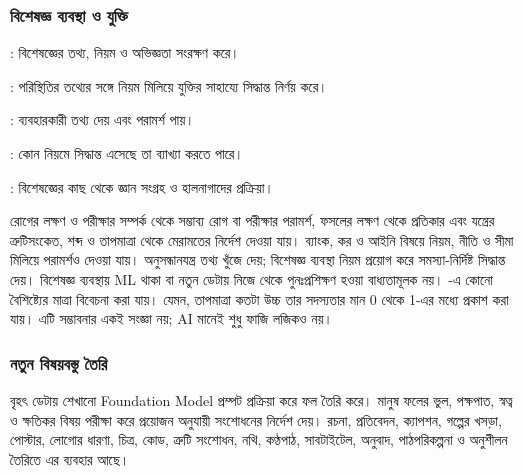 \begin{topicbody}
\subsubsection{বিশেষজ্ঞ ব্যবস্থা ও যুক্তি}
\begin{compactpoints}
\item {}: বিশেষজ্ঞের তথ্য, নিয়ম ও অভিজ্ঞতা সংরক্ষণ করে।
\item {}: পরিস্থিতির তথ্যের সঙ্গে নিয়ম মিলিয়ে যুক্তির সাহায্যে সিদ্ধান্ত নির্ণয় করে।
\item {}: ব্যবহারকারী তথ্য দেয় এবং পরামর্শ পায়।
\item {}: কোন নিয়মে সিদ্ধান্ত এসেছে তা ব্যাখ্যা করতে পারে।
\item {}: বিশেষজ্ঞের কাছ থেকে জ্ঞান সংগ্রহ ও হালনাগাদের প্রক্রিয়া।
\end{compactpoints}
রোগের লক্ষণ ও পরীক্ষার সম্পর্ক থেকে সম্ভাব্য রোগ বা পরীক্ষার পরামর্শ, ফসলের লক্ষণ থেকে প্রতিকার এবং যন্ত্রের ত্রুটিসংকেত, শব্দ ও তাপমাত্রা থেকে মেরামতের নির্দেশ দেওয়া যায়। ব্যাংক, কর ও আইনি বিষয়ে নিয়ম, নীতি ও সীমা মিলিয়ে পরামর্শও দেওয়া যায়। অনুসন্ধানযন্ত্র তথ্য খুঁজে দেয়; বিশেষজ্ঞ ব্যবস্থা নিয়ম প্রয়োগ করে সমস্যা-নির্দিষ্ট সিদ্ধান্ত দেয়। বিশেষজ্ঞ ব্যবস্থায় ML থাকা বা নতুন ডেটায় নিজে থেকে পুনঃপ্রশিক্ষণ হওয়া বাধ্যতামূলক নয়।
-এ কোনো বৈশিষ্ট্যের মাত্রা বিবেচনা করা যায়। যেমন, তাপমাত্রা কতটা উচ্চ তার সদস্যতার মান 0 থেকে 1-এর মধ্যে প্রকাশ করা যায়। এটি সম্ভাবনার একই সংজ্ঞা নয়; AI মানেই শুধু ফাজি লজিকও নয়।
\subsubsection{নতুন বিষয়বস্তু তৈরি}
বৃহৎ ডেটায় শেখানো Foundation Model প্রম্পট প্রক্রিয়া করে ফল তৈরি করে। মানুষ ফলের ভুল, পক্ষপাত, স্বত্ব ও ক্ষতিকর বিষয় পরীক্ষা করে প্রয়োজন অনুযায়ী সংশোধনের নির্দেশ দেয়। রচনা, প্রতিবেদন, ক্যাপশন, গল্পের খসড়া, পোস্টার, লোগোর ধারণা, চিত্র, কোড, ত্রুটি সংশোধন, নথি, কণ্ঠপাঠ, সাবটাইটেল, অনুবাদ, পাঠপরিকল্পনা ও অনুশীলন তৈরিতে এর ব্যবহার আছে।

\end{topicbody}
